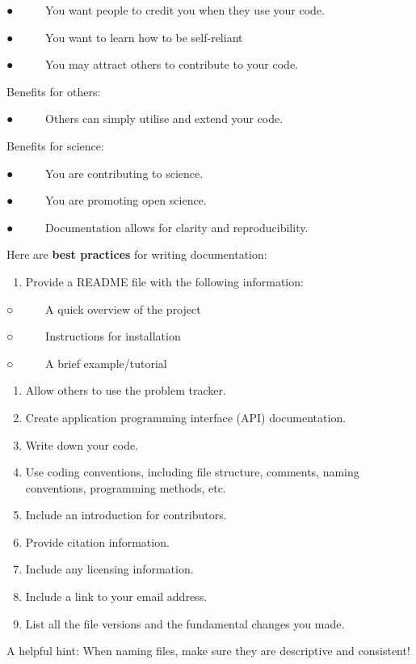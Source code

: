 \documentclass[
]{book}
\providecommand{\tightlist}{%
  \setlength{\itemsep}{0pt}\setlength{\parskip}{0pt}}
\begin{document}
● ~ ~ ~ You want people to credit you when they use your code.

● ~ ~ ~ You want to learn how to be self-reliant

● ~ ~ ~ You may attract others to contribute to your code.

Benefits for others:

● ~ ~ ~ Others can simply utilise and extend your code.

Benefits for science:

● ~ ~ ~ You are contributing to science.

● ~ ~ ~ You are promoting open science.

● ~ ~ ~ Documentation allows for clarity and reproducibility.

Here are \textbf{best practices} for writing documentation:

\begin{enumerate}
\def\labelenumi{\arabic{enumi}.}
\tightlist
\item
  Provide a README file with the following information:
\end{enumerate}

○ ~ ~ ~ A quick overview of the project

○ ~ ~ ~ Instructions for installation

○ ~ ~ ~ A brief example/tutorial

\begin{enumerate}
\def\labelenumi{\arabic{enumi}.}
\tightlist
\item
  Allow others to use the problem tracker.
\item
  Create application programming interface (API) documentation.
\item
  Write down your code.
\item
  Use coding conventions, including file structure, comments, naming conventions, programming methods, etc.
\item
  Include an introduction for contributors.
\item
  Provide citation information.
\item
  Include any licensing information.
\item
  Include a link to your email address.
\item
  List all the file versions and the fundamental changes you made.
\end{enumerate}

A helpful hint: When naming files, make sure they are descriptive and consistent!
\end{document}
